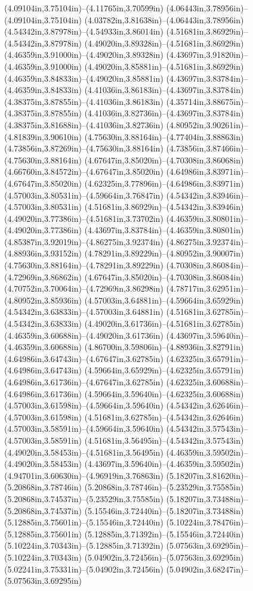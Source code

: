 (4.09104in,3.75104in)--(4.11765in,3.70599in) (4.06443in,3.78956in)--(4.09104in,3.75104in) (4.03782in,3.81638in)--(4.06443in,3.78956in) (4.54342in,3.87978in)--(4.54933in,3.86014in) (4.51681in,3.86929in)--(4.54342in,3.87978in) (4.49020in,3.89328in)--(4.51681in,3.86929in) (4.46359in,3.91000in)--(4.49020in,3.89328in) (4.43697in,3.91820in)--(4.46359in,3.91000in) (4.49020in,3.85881in)--(4.51681in,3.86929in) (4.46359in,3.84833in)--(4.49020in,3.85881in) (4.43697in,3.83784in)--(4.46359in,3.84833in) (4.41036in,3.86183in)--(4.43697in,3.83784in) (4.38375in,3.87855in)--(4.41036in,3.86183in) (4.35714in,3.88675in)--(4.38375in,3.87855in) (4.41036in,3.82736in)--(4.43697in,3.83784in) (4.38375in,3.81688in)--(4.41036in,3.82736in) (4.80952in,3.90261in)--(4.81839in,3.90610in) (4.75630in,3.88164in)--(4.77404in,3.88863in) (4.73856in,3.87269in)--(4.75630in,3.88164in) (4.73856in,3.87466in)--(4.75630in,3.88164in) (4.67647in,3.85020in)--(4.70308in,3.86068in) (4.66760in,3.84572in)--(4.67647in,3.85020in) (4.64986in,3.83971in)--(4.67647in,3.85020in) (4.62325in,3.77896in)--(4.64986in,3.83971in) (4.57003in,3.80531in)--(4.59664in,3.76847in) (4.54342in,3.83946in)--(4.57003in,3.80531in) (4.51681in,3.86929in)--(4.54342in,3.83946in) (4.49020in,3.77386in)--(4.51681in,3.73702in) (4.46359in,3.80801in)--(4.49020in,3.77386in) (4.43697in,3.83784in)--(4.46359in,3.80801in) (4.85387in,3.92019in)--(4.86275in,3.92374in) (4.86275in,3.92374in)--(4.88936in,3.93152in) (4.78291in,3.89229in)--(4.80952in,3.90007in) (4.75630in,3.88164in)--(4.78291in,3.89229in) (4.70308in,3.86084in)--(4.72969in,3.86862in) (4.67647in,3.85020in)--(4.70308in,3.86084in) (4.70752in,3.70064in)--(4.72969in,3.86298in) (4.78717in,3.62951in)--(4.80952in,3.85936in) (4.57003in,3.64881in)--(4.59664in,3.65929in) (4.54342in,3.63833in)--(4.57003in,3.64881in) (4.51681in,3.62785in)--(4.54342in,3.63833in) (4.49020in,3.61736in)--(4.51681in,3.62785in) (4.46359in,3.60688in)--(4.49020in,3.61736in) (4.43697in,3.59640in)--(4.46359in,3.60688in) (4.86700in,3.59806in)--(4.88936in,3.82791in) (4.64986in,3.64743in)--(4.67647in,3.62785in) (4.62325in,3.65791in)--(4.64986in,3.64743in) (4.59664in,3.65929in)--(4.62325in,3.65791in) (4.64986in,3.61736in)--(4.67647in,3.62785in) (4.62325in,3.60688in)--(4.64986in,3.61736in) (4.59664in,3.59640in)--(4.62325in,3.60688in) (4.57003in,3.61598in)--(4.59664in,3.59640in) (4.54342in,3.62646in)--(4.57003in,3.61598in) (4.51681in,3.62785in)--(4.54342in,3.62646in) (4.57003in,3.58591in)--(4.59664in,3.59640in) (4.54342in,3.57543in)--(4.57003in,3.58591in) (4.51681in,3.56495in)--(4.54342in,3.57543in) (4.49020in,3.58453in)--(4.51681in,3.56495in) (4.46359in,3.59502in)--(4.49020in,3.58453in) (4.43697in,3.59640in)--(4.46359in,3.59502in) (4.94701in,3.60630in)--(4.96919in,3.76863in) (5.18207in,3.81620in)--(5.20868in,3.78746in) (5.20868in,3.78746in)--(5.23529in,3.75585in) (5.20868in,3.74537in)--(5.23529in,3.75585in) (5.18207in,3.73488in)--(5.20868in,3.74537in) (5.15546in,3.72440in)--(5.18207in,3.73488in) (5.12885in,3.75601in)--(5.15546in,3.72440in) (5.10224in,3.78476in)--(5.12885in,3.75601in) (5.12885in,3.71392in)--(5.15546in,3.72440in) (5.10224in,3.70343in)--(5.12885in,3.71392in) (5.07563in,3.69295in)--(5.10224in,3.70343in) (5.04902in,3.72456in)--(5.07563in,3.69295in) (5.02241in,3.75331in)--(5.04902in,3.72456in) (5.04902in,3.68247in)--(5.07563in,3.69295in) 